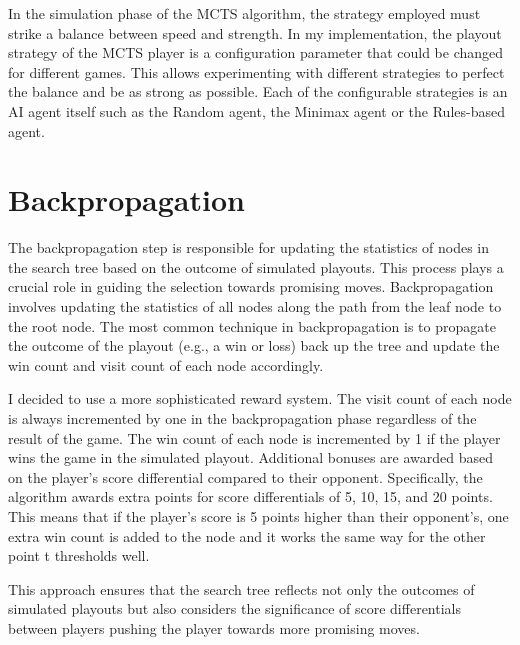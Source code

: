 In the simulation phase of the MCTS algorithm, the strategy employed must strike a balance between speed and strength. In my implementation, the playout
strategy of the MCTS player is a configuration parameter that could be changed for different games. This allows experimenting with different strategies to perfect the balance and 
be as strong as possible. Each of the configurable strategies is an AI agent itself such as the Random agent, the Minimax agent or the Rules-based agent.


\section{Backpropagation}

The backpropagation step is responsible for updating the statistics of nodes in the search tree based on the outcome of simulated playouts. This process plays a crucial role in 
guiding the selection towards promising moves. Backpropagation involves updating the statistics of all nodes along the path from the leaf node to the root node. 
The most common technique in backpropagation is to propagate the outcome of the playout (e.g., a win or loss) back up the tree and update the win count and visit count of each node accordingly. 

I decided to use a more sophisticated reward system. The visit count of each node is always incremented by one in the backpropagation phase regardless of the result of the game.
The win count of each node is incremented by 1 if the player wins the game in the simulated playout.  Additional bonuses are awarded based on the player's score differential compared 
to their opponent.  Specifically, the algorithm awards extra points for score differentials of 5, 10, 15, and 20 points. This means that if the player's score is 5 points higher 
than their opponent's, one extra win count is added to the node and it works the same way for the other point t thresholds well. 

This approach ensures that the search tree reflects not only the outcomes of simulated playouts but also considers the significance of score differentials between players pushing
the player towards more promising moves. 


